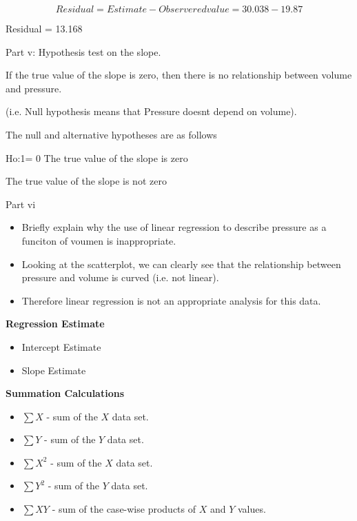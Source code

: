 \documentclass[]{report}
\begin{document}
\[Residual = Estimate - Observered value = 30.038 - 19.87\]

Residual = 13.168 

Part v: Hypothesis test on the slope.


If the true value of the slope is zero, then there is no relationship between volume and pressure.

(i.e. Null hypothesis means that Pressure doesnt depend on volume).


The null and alternative hypotheses are as follows

Ho:1= 0  	 The true value of the slope is zero


The true value of the slope is not zero






Part vi
\begin{itemize}
	\item Briefly explain why the  use of linear regression to describe pressure as a funciton of voumen is inappropriate.
	
	\item Looking at the scatterplot, we can clearly see that the relationship between pressure and volume is curved (i.e. not linear). 
	
	\item Therefore linear regression is not an appropriate analysis for this data.
\end{itemize}


	
	
	


\noindent \textbf{Regression Estimate}
\begin{itemize}
	\item Intercept Estimate
	\item Slope Estimate
\end{itemize}

\noindent \textbf{Summation Calculations}
\begin{itemize}
	\item $\sum X$ - sum of the $X$ data set.
	\item $\sum Y$ - sum of the $Y$ data set.
	\item $\sum X^2$ - sum of the $X$ data set.
	\item $\sum Y^2$ - sum of the $Y$ data set.
	\item $\sum XY$ - sum of the case-wise products  of $X$ and $Y$ values.
\end{itemize}
\end{document}
